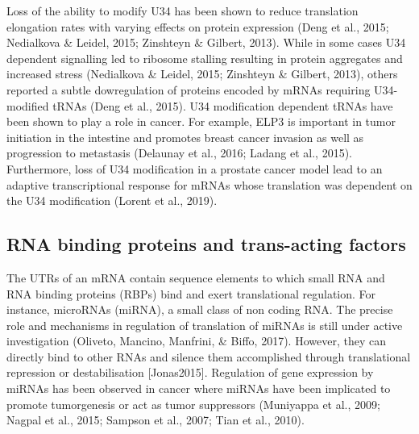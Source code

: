 \documentclass[
  12pt,
  openany]{book}
\begin{document}
Loss of the ability to modify U34 has been shown to reduce translation elongation rates with varying effects on protein expression (Deng et al., 2015; Nedialkova \& Leidel, 2015; Zinshteyn \& Gilbert, 2013). While in some cases U34 dependent signalling led to ribosome stalling resulting in protein aggregates and increased stress (Nedialkova \& Leidel, 2015; Zinshteyn \& Gilbert, 2013), others reported a subtle dowregulation of proteins encoded by mRNAs requiring U34-modified tRNAs (Deng et al., 2015). U34 modification dependent tRNAs have been shown to play a role in cancer. For example, ELP3 is important in tumor initiation in the intestine and promotes breast cancer invasion as well as progression to metastasis (Delaunay et al., 2016; Ladang et al., 2015). Furthermore, loss of U34 modification in a prostate cancer model lead to an adaptive transcriptional response for mRNAs whose translation was dependent on the U34 modification (Lorent et al., 2019).

\subsection{RNA binding proteins and trans-acting factors}

The UTRs of an mRNA contain sequence elements to which small RNA and RNA binding proteins (RBPs) bind and exert translational regulation. For instance, microRNAs (miRNA), a small class of non coding RNA. The precise role and mechanisms in regulation of translation of miRNAs is still under active investigation (Oliveto, Mancino, Manfrini, \& Biffo, 2017). However, they can directly bind to other RNAs and silence them accomplished through translational repression or destabilisation {[}Jonas2015{]}. Regulation of gene expression by miRNAs has been observed in cancer where miRNAs have been implicated to promote tumorgenesis or act as tumor suppressors (Muniyappa et al., 2009; Nagpal et al., 2015; Sampson et al., 2007; Tian et al., 2010).
\end{document}
